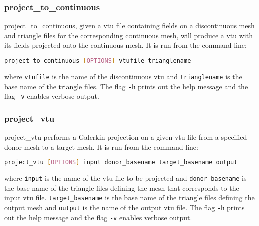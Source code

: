 
\subsubsection{project\_to\_continuous}
\label{sect:project_to_continuous}
project\_to\_continuous, given a vtu file containing fields on a discontinuous mesh and triangle files for the corresponding continuous mesh, will produce a vtu with its fields projected onto the continuous mesh. It is run from the command line:

\begin{lstlisting}[language = Bash]
project_to_continuous [OPTIONS] vtufile trianglename
\end{lstlisting}

where \lstinline[language = Bash]+vtufile+ is the name of the discontinuous vtu and \lstinline[language = Bash]+trianglename+ is the base name of the triangle files. The flag \lstinline[language = Bash]+-h+ prints out the help message and the flag \lstinline[language = Bash]+-v+ enables verbose output.



\subsubsection{project\_vtu}
\label{sect:project_vtu}
project\_vtu performs a Galerkin projection on a given vtu file from a specified donor mesh to a target mesh. It is run from the command line:

\begin{lstlisting}[language = Bash]
project_vtu [OPTIONS] input donor_basename target_basename output
\end{lstlisting}

where \lstinline[language = Bash]+input+ is the name of the vtu file to be projected and \lstinline[language = Bash]+donor_basename+ is the base name of the triangle files defining the mesh that corresponds to the input vtu file. 
\lstinline[language = Bash]+target_basename+ is the base name of the triangle files defining the output mesh and \lstinline[language = Bash]+output+ is the name of the output vtu file.
The flag \lstinline[language = Bash]+-h+ prints out the help message and the flag \lstinline[language = Bash]+-v+ enables verbose output.



